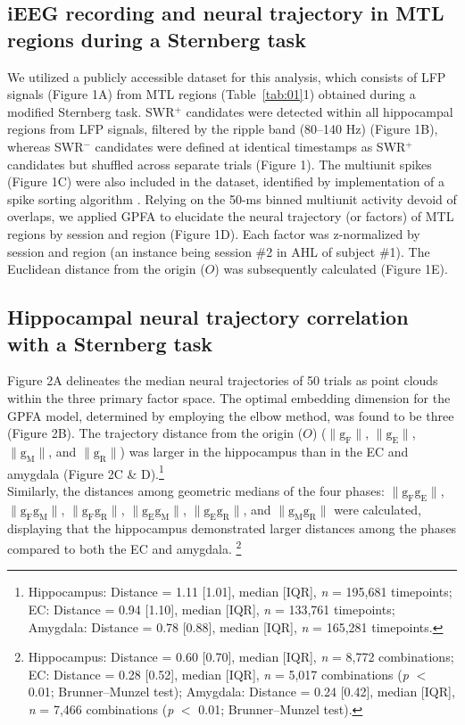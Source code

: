 \documentclass[final,3p,times,twocolumn]{elsarticle}
\begin{document}
\subsection{iEEG recording and neural trajectory in MTL regions during a Sternberg task}
We utilized a publicly accessible dataset \cite{boran_dataset_2020} for this analysis, which consists of LFP signals (Figure 1A) from MTL regions (Table~\ref{tab:01}1) obtained during a modified Sternberg task. SWR$^+$ candidates were detected within all hippocampal regions from LFP signals, filtered by the ripple band (80--140 Hz) (Figure 1B), whereas SWR$^-$ candidates were defined at identical timestamps as SWR$^+$ candidates but shuffled across separate trials (Figure 1). The multiunit spikes (Figure 1C) were also included in the dataset, identified by implementation of a spike sorting algorithm \cite{niediek_reliable_2016}. Relying on the 50-ms binned multiunit activity devoid of overlaps, we applied GPFA \cite{yu_gaussian-process_2009} to elucidate the neural trajectory (or factors) of MTL regions by session and region (Figure 1D). Each factor was z-normalized by session and region (an instance being session \#2 in AHL of subject \#1). The Euclidean distance from the origin ($O$) was subsequently calculated (Figure 1E).

\subsection{Hippocampal neural trajectory correlation with a Sternberg task}
Figure 2A delineates the median neural trajectories of 50 trials as point clouds within the three primary factor space. The optimal embedding dimension for the GPFA model, determined by employing the elbow method, was found to be three (Figure 2B). The trajectory distance from the origin ($O$) ($\mathrm{\lVert g_{F} \rVert}$, $\mathrm{\lVert g_{E} \rVert}$, $\mathrm{\lVert g_{M} \rVert}$, and $\mathrm{\lVert g_{R} \rVert}$) was larger in the hippocampus than in the EC and amygdala (Figure 2C \& D).\footnote{Hippocampus: Distance = 1.11 [1.01], median [IQR], \textit{n} = 195,681 timepoints; EC: Distance = 0.94 [1.10], median [IQR], \textit{n} = 133,761 timepoints; Amygdala: Distance = 0.78 [0.88], median [IQR], \textit{n} = 165,281 timepoints.}
\\
\indent
Similarly, the distances among geometric medians of the four phases: $\mathrm{\lVert g_{F}g_{E} \rVert}$, $\mathrm{\lVert g_{F}g_{M} \rVert}$, $\mathrm{\lVert g_{F}g_{R} \rVert}$, $\mathrm{\lVert g_{E}g_{M} \rVert}$, $\mathrm{\lVert g_{E}g_{R} \rVert}$, and $\mathrm{\lVert g_{M}g_{R} \rVert}$ were calculated, displaying that the hippocampus demonstrated larger distances among the phases compared to both the EC and amygdala. \footnote{Hippocampus: Distance = 0.60 [0.70], median [IQR], \textit{n} = 8,772 combinations; EC: Distance = 0.28 [0.52], median [IQR], \textit{n} = 5,017 combinations (\textit{p} $<$ 0.01; Brunner--Munzel test); Amygdala: Distance = 0.24 [0.42], median [IQR], \textit{n} = 7,466 combinations (\textit{p} $<$ 0.01; Brunner--Munzel test).}
\end{document}
